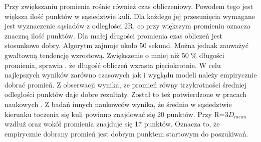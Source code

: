 Przy zwiększaniu promienia rośnie również czas obliczeniowy. Powodem tego jest większa ilość punktów w sąsiedztwie kuli. Dla każdego jej przesunięcia wymagane jest wyznaczenie sąsiadów z odległości 2R, co przy większym promieniu oznacza znaczną ilość punktów. Dla małej długości promienia czas obliczeń jest stosunkowo dobry. Algorytm zajmuje około 50 sekund. Można jednak zauważyć gwałtowną tendencję wzrostową. Zwiększenie o mniej niż 50 \% długości promienia, sprawia , że długość obliczeń wzrasta pięciokrotnie. W celu najlepszych wyników zarówno czasowych jak i wyglądu modeli należy empirycznie dobrać promień. Z obserwacji wynika, że promień równy trzykrotności średniej odległości punktów daje dobre rezultaty. Został to też potwierdzone w pracach naukowych \cite{mittleman1999ball}. Z badań innych naukowców wynika, że średnio w sąsiedztwie kierunku toczenia się kuli powinno znajdować się 20 punktów. Przy R=3$D_{mean}$ wzdłuż oraz wokół promienia znajduje się 17 punktów. Oznacza to, że empirycznie dobrany promień jest dobrym punktem startowym do poszukiwań.

